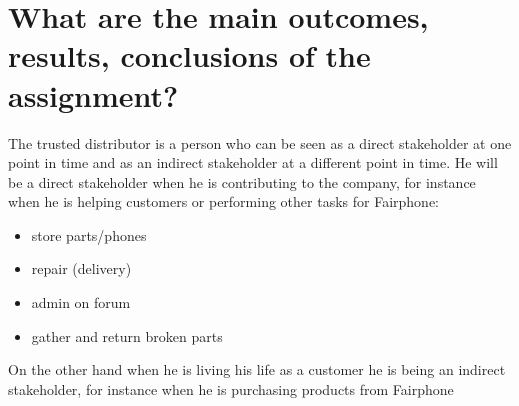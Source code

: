 \section{What are the main outcomes, results, conclusions of the assignment?}


The trusted distributor is a person who can be seen as a direct stakeholder at one point in time and as an indirect stakeholder at a different point in time. He will be a direct stakeholder when he is contributing to the company, for instance when he is helping customers or performing other tasks for Fairphone: 	

\begin{itemize}
	\item store parts/phones
	\item repair (delivery)
	\item admin on forum
	\item gather and return broken parts
	
\end{itemize}
On the other hand when he is living his life as a customer he is being an indirect stakeholder, for instance when he is purchasing products from Fairphone 
